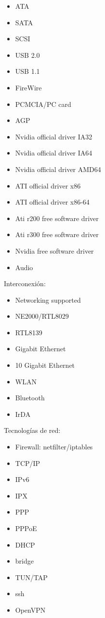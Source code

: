 			\begin{itemize}
				\item ATA
				\item SATA
				\item SCSI
				\item USB 2.0 	
				\item USB 1.1
				\item FireWire
				\item PCMCIA/PC card
				\item AGP
				\item Nvidia official driver IA32
				\item Nvidia official driver IA64
				\item Nvidia official driver AMD64
				\item ATI official driver x86
				\item ATI official driver x86-64
				\item Ati r200 free software driver
				\item Ati r300 free software driver
				\item Nvidia free software driver
				\item Audio
			\end{itemize}
Interconexión:

			\begin{itemize}
				\item Networking supported	
				\item NE2000/RTL8029
				\item RTL8139
				\item Gigabit Ethernet 	
				\item 10 Gigabit Ethernet
				\item WLAN
				\item Bluetooth
				\item IrDA
			\end{itemize}

Tecnologías de red:

			\begin{itemize}
				\item Firewall: netfilter/iptables
				\item TCP/IP	
				\item IPv6
				\item IPX 	
				\item PPP			
				\item PPPoE
				\item DHCP
				\item bridge
				\item TUN/TAP
				\item ssh
				\item OpenVPN
			\end{itemize}

